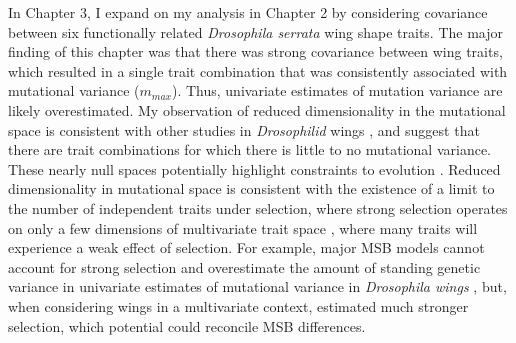 In Chapter 3, I expand on my analysis in Chapter 2 by considering covariance between six functionally related \textit{Drosophila serrata} wing shape traits. The major finding of this chapter was that there was strong covariance between wing traits, which resulted in a single trait combination that was consistently associated with mutational variance ($m_{max}$). Thus, univariate estimates of mutation variance are likely overestimated. My observation of reduced dimensionality in the mutational space is consistent with other studies in \textit{Drosophilid} wings \citep{Houl13,Houl17,Duga21}, and suggest that there are trait combinations for which there is little to no mutational variance. These nearly null spaces potentially highlight constraints to evolution \citep{Gomu09, Houl13,Hine14}. Reduced dimensionality in mutational space is consistent with the existence of a limit to the number of independent traits under selection, where strong selection operates on only a few dimensions of multivariate trait space \citep{Bart90, Wals09}, where many traits will experience a weak effect of selection. For example, major MSB models cannot account for strong selection and overestimate the amount of standing genetic variance in univariate estimates of mutational variance in \textit{Drosophila wings} \citep{McGu15}, but, when considering wings in a multivariate context, \citep{Duga21} estimated much stronger selection, which potential could reconcile MSB differences. \par

